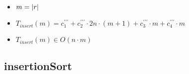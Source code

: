 \documentclass{article}
\begin{document}
    \begin{minipage}{0.70\textwidth}
        
    \end{minipage}
    \hfill
    \begin{minipage}{0.25\textwidth}
    \end{minipage}

    \begin{itemize}
        \item $m = |r|$
        \item $T_{insert}(m) = c^{\prime\prime\prime}_1 +
                               c^{\prime\prime\prime}_2 \cdot 2n \cdot (m+1) +
                               c^{\prime\prime\prime}_3 \cdot m +
                               c^{\prime\prime\prime}_4 \cdot m $
        \item $T_{insert}(m) \in O(n \cdot m)$
    \end{itemize}

    \subsection*{insertionSort}
\end{document}

